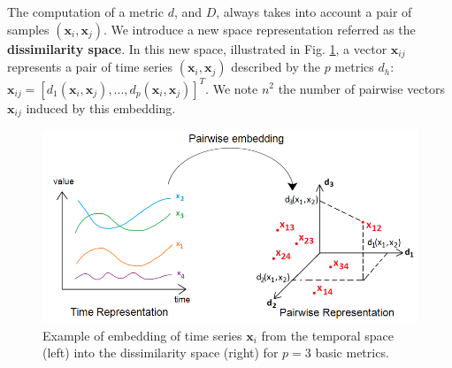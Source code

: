 The computation of a metric $d$, and $D$, always takes into account a pair of samples $(\textbf{x}_i,\textbf{x}_j)$. We introduce a new space representation referred as the \textbf{dissimilarity space}. In this new space, illustrated in Fig. \ref{fig:PairwiseEmbedding}, a vector $\textbf{x}_{ij}$ represents a pair of time series $(\textbf{x}_i,\textbf{x}_j)$ described by the $p$ metrics $d_h$: $\textbf{x}_{ij}=[d_1(\textbf{x}_i,\textbf{x}_j), ..., d_p(\textbf{x}_i,\textbf{x}_j)]^T$. We note $n^2$ the number of pairwise vectors $\textbf{x}_{ij}$ induced by this embedding.


\begin{figure}[h!]
	\begin{minipage}[b]{1.0\linewidth}
		\centering
		\includegraphics[width=0.9\linewidth]{images/PairwiseEmbedding}
	\end{minipage}
	\caption{Example of embedding of time series $\textbf{x}_i$ from the temporal space (left) into the dissimilarity space (right) for $p=3$ basic metrics.}
	\label{fig:PairwiseEmbedding}
\end{figure}

